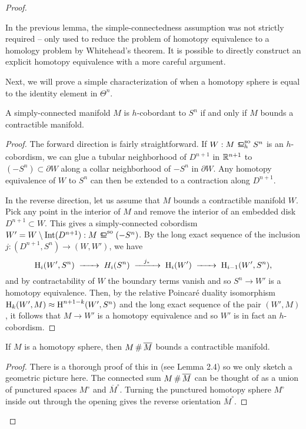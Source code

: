 \begin{proof}
	\begin{remark*}
		In the previous lemma, the simple-connectedness assumption was not strictly required -- only used to reduce the problem of homotopy equivalence to a homology problem by Whitehead's theorem. It is possible to directly construct an explicit homotopy equivalence with a more careful argument.
	\end{remark*}

	Next, we will prove a simple characterization of when a homotopy sphere is equal to the identity element in $\Theta^n$.

	\begin{lemma}\label{lemma:null-h-cobordant-iff-bounds-contractible}
		A simply-connected manifold $M$ is $h$-cobordant to $S^n$ if and only if $M$ bounds a contractible manifold.
	\end{lemma}
	\begin{proof}
		The forward direction is fairly straightforward. If $W : M\sohbord S^n$ is an $h$-cobordism, we can glue a tubular neighborhood of $D^{n+1}$ in $\mathbb{R}^{n+1}$ to $(-S^n)\subset \partial W$ along a collar neighborhood of $-S^n$ in $\partial W$. Any homotopy equivalence of $W$ to $S^n$ can then be extended to a contraction along $D^{n+1}$.

		In the reverse direction, let us assume that $M$ bounds a contractible manifold $W$. Pick any point in the interior of $M$ and remove the interior of an embedded disk $D^{n+1}\subset W$. This gives a simply-connected cobordism $W'=W\setminus \Int(D^{n+1}) : M\sobord (-S^n)$. By the long exact sequence of the inclusion $j : (D^{n+1}, S^n) \to (W,W')$, we have
		\[
			\H_i(W', S^n) \lkxto H_i(S^n)\lkxto[j_*] \H_i(W')\lkxto \H_{i-1}(W',S^n),
		\]
		and by contractability of $W$ the boundary terms vanish and so $S^n \to W'$ is a homotopy equivalence. Then, by the relative Poincar\'e duality isomorphism $\operatorname{H}_k(W',M)\approx \operatorname{H}^{n+1-k}(W', S^n)$ and the long exact sequence of the pair $(W',M)$, it follows that $M\to W'$ is a homotopy equivalence and so $W'$ is in fact an $h$-cobordism. 
	\end{proof}

	\begin{lemma}
		If $M$ is a homotopy sphere, then $M\+\overline{M}$ bounds a contractible manifold.
	\end{lemma}
	\begin{proof}
		There is a thorough proof of this in \cite{milnorkervaire1963groups} (see Lemma 2.4) so we only sketch a geometric picture here. The connected sum $M\+\overline{M}$ can be thought of as a union of punctured spaces $M^\circ$ and $\overline{M}^\circ$. Turning the punctured homotopy sphere $M^\circ$ inside out through the opening gives the reverse orientation $\overline{M}^\circ$.


\end{proof}
\end{proof}
